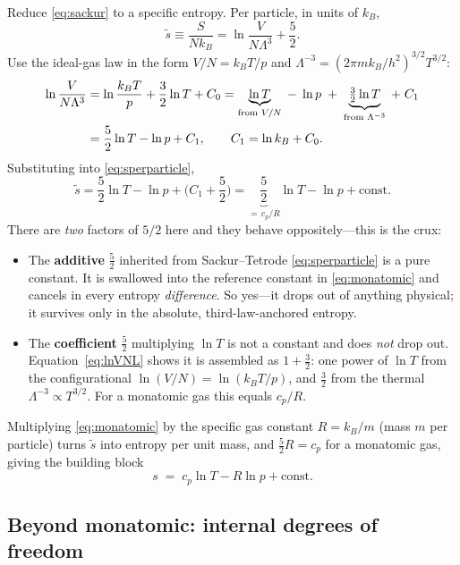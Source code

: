 \documentclass[11pt,a4paper]{article}
\theoremstyle{definition}
\begin{document}
Reduce \eqref{eq:sackur} to a specific entropy. Per particle, in units of
$k_B$,
\begin{equation}\label{eq:sperparticle}
\tilde s\equiv\frac{S}{N k_B}=\ln\frac{V}{N\Lambda^{3}}+\frac52 .
\end{equation}
Use the ideal-gas law in the form $V/N=k_BT/p$ and
$\Lambda^{-3}=(2\pi m k_B/h^{2})^{3/2}T^{3/2}$:
\begin{align}
\ln\frac{V}{N\Lambda^{3}}
&=\ln\frac{k_BT}{p}+\frac32\ln T+C_0
 =\underbrace{\ln T}_{\text{from }V/N}\;-\;\ln p\;+\;
   \underbrace{\tfrac32\ln T}_{\text{from }\Lambda^{-3}}\;+\;C_1 \notag\\
&=\frac52\ln T-\ln p+C_1 ,\qquad C_1=\ln k_B+C_0 .
\label{eq:lnVNL}
\end{align}
Substituting into \eqref{eq:sperparticle},
\begin{equation}\label{eq:monatomic}
\tilde s=\frac52\ln T-\ln p+\Big(C_1+\frac52\Big)
        =\underbrace{\frac52}_{=\,c_p/R}\ln T-\ln p+\mathrm{const}.
\end{equation}
There are \emph{two} factors of $5/2$ here and they behave oppositely---this is
the crux:
\begin{itemize}
\item The \textbf{additive} $\tfrac52$ inherited from Sackur--Tetrode
      \eqref{eq:sperparticle} is a pure constant. It is swallowed into the
      reference constant in \eqref{eq:monatomic} and cancels in every entropy
      \emph{difference}. So yes---it drops out of anything physical; it survives
      only in the absolute, third-law-anchored entropy.
\item The \textbf{coefficient} $\tfrac52$ multiplying $\ln T$ is not a constant
      and does \emph{not} drop out. Equation~\eqref{eq:lnVNL} shows it is
      assembled as $1+\tfrac32$: one power of $\ln T$ from the configurational
      $\ln(V/N)=\ln(k_BT/p)$, and $\tfrac32$ from the thermal
      $\Lambda^{-3}\!\propto T^{3/2}$. For a monatomic gas this equals $c_p/R$.
\end{itemize}
Multiplying \eqref{eq:monatomic} by the specific gas constant $R=k_B/m$ (mass
$m$ per particle) turns $\tilde s$ into entropy per unit mass, and
$\tfrac52 R=c_p$ for a monatomic gas, giving the building block
\begin{equation}\label{eq:idealS}
\boxed{\;s \;=\; c_p\ln T - R\ln p + \mathrm{const}.\;}
\end{equation}

\subsection{Beyond monatomic: internal degrees of freedom}\label{ssec:polyatomic}
\end{document}
